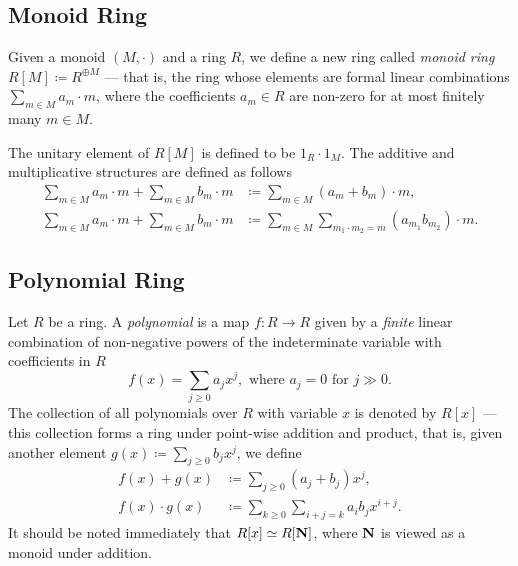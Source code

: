 \subsection{Monoid Ring}

%
\begin{definition}
    \label{def:monoid-ring}
    Given a monoid \((M, \cdot)\) and a ring \(R\), we define a new ring called
    \emph{monoid ring} \(R[M] \coloneq R^{\oplus M}\) --- that is, the ring whose
    elements are formal linear combinations \(\sum_{m \in M} a_m \cdot m\), where
    the coefficients \(a_m \in R\) are non-zero for at most finitely many
    \(m \in M\).

    The unitary element of \(R[M]\) is defined to be \(1_R \cdot 1_{M}\). The
    additive and multiplicative structures are defined as follows
    \begin{align*}
        \sum_{m \in M} a_m \cdot m + \sum_{m \in M} b_m \cdot m
         & \coloneq \sum_{m \in M} (a_m + b_m) \cdot m,                                \\
        \sum_{m \in M} a_m \cdot m + \sum_{m \in M} b_m \cdot m
         & \coloneq \sum_{m \in M} \sum_{m_1 \cdot m_2 = m} (a_{m_1} b_{m_2}) \cdot m.
    \end{align*}
\end{definition}
%

\subsection{Polynomial Ring}

%
\begin{definition}[Polynomial]
    \label{def:polynomial}
    Let \(R\) be a ring. A \emph{polynomial} is a map \(f: R \to R\) given by a
    \emph{finite} linear combination of non-negative powers of the indeterminate
    variable with coefficients in \(R\)
    \[
        f(x) = \sum_{j \geq 0} a_j x^j, \text{ where } a_j = 0 \text{ for } j \gg 0.
    \]
    The collection of all polynomials over \(R\) with variable \(x\) is denoted by
    \(R[x]\) --- this collection forms a ring under point-wise addition and product,
    that is, given another element \(g(x) \coloneq \sum_{j \geq 0} b_j x^j\), we
    define
    \begin{align*}
        f(x) + g(x)     & \coloneq \sum_{j \geq 0} (a_j + b_j) x^j,                    \\
        f(x) \cdot g(x) & \coloneq \sum_{k \geq 0} \sum_{i + j = k} a_i b_j x^{i + j}.
    \end{align*}
    It should be noted immediately that \(R[x] \simeq R[\mathbf{N}]\), where \(\mathbf{N}\) is viewed
    as a monoid under addition.
\end{definition}
%

